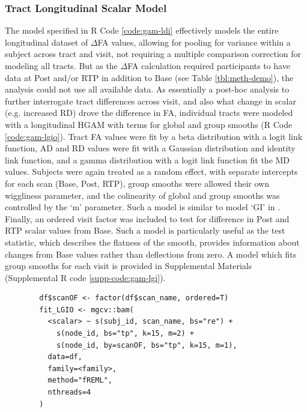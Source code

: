 \documentclass[]{imag-ms-template}
\begin{document}
\subsubsection{Tract Longitudinal Scalar Model}
\label{sssec:meth-gam-lgio}
The model specified in R Code \ref{code:gam-ldi} effectively models the entire longitudinal dataset of $\Delta$FA values, allowing for pooling for variance within a subject across tract and visit, not requiring a multiple comparison correction for modeling all tracts. But as the $\Delta$FA calculation required participants to have data at Post and/or RTP in addition to Base (see Table \ref{tbl:meth-demo}), the analysis could not use all available data. As essentially a post-hoc analysis to further interrogate tract differences across visit, and also what change in scalar (e.g. increased RD) drove the difference in FA, individual tracts were modeled with a longitudinal HGAM with terms for global and group smooths (R Code \ref{code:gam-lgio}). Tract FA values were fit by a beta distribution with a logit link function, AD and RD values were fit with a Gaussian distribution and identity link function, and a gamma distribution with a logit link function fit the MD values. Subjects were again treated as a random effect, with separate intercepts for each scan (Base, Post, RTP), group smooths were allowed their own wiggliness parameter, and the colinearity of global and group smooths was controlled by the `m' parameter. Such a model is similar to model `GI' in \textcite{pedersen2019HierarchicalGeneralizedAdditive}. Finally, an ordered visit factor was included to test for difference in Post and RTP scalar values from Base. Such a model is particularly useful as the test statistic, which describes the flatness of the smooth, provides information about changes from Base values rather than deflections from zero. A model which fits group smooths for each visit is provided in Supplemental Materials (Supplemental R code \ref{supp-code:gam-lgi}).

\begin{equ}[H]
	\begin{lstlisting}
		df$scanOF <- factor(df$scan_name, ordered=T)
		fit_LGIO <- mgcv::bam(
		  <scalar> ~ s(subj_id, scan_name, bs="re") +
		    s(node_id, bs="tp", k=15, m=2) +
		    s(node_id, by=scanOF, bs="tp", k=15, m=1),
		  data=df,
		  family=<family>,
		  method="fREML",
		  nthreads=4
		)
	\end{lstlisting}
	\caption{Tract scalars are modeled as a function of tract node with thin-plate regression splines using both global and group (\lstinline{scan_name}) smooths as well as individual group wiggliness. An ordered factor of scan visit was used to compare Post and RTP to Base. \lstinline{<scalar>} = relevant DWI metric (AD, RD, MD, or FA), \lstinline{scan_name} = visit identifier factor (Base, Post, RTP), \lstinline{scanOF} = ordered factor of \lstinline{scan_name}, \lstinline{<family>} = relevant family and link function for scalar distribution.}
	\label{code:gam-lgio}
\end{equ}
\end{document}
